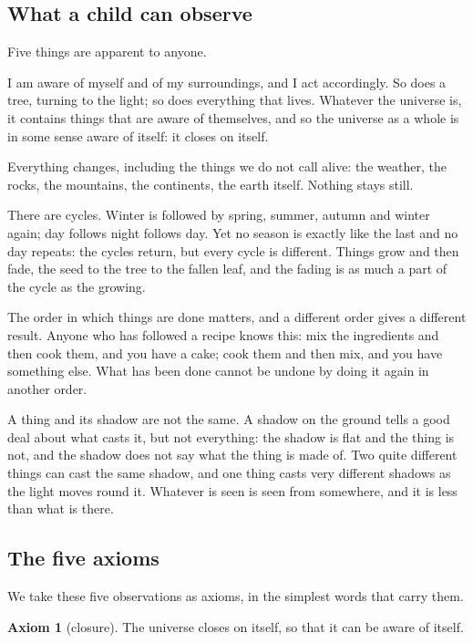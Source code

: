 \documentclass[11pt,a4paper]{article}
\theoremstyle{plain}
\theoremstyle{definition}
\newtheorem{axiom}{Axiom}
\theoremstyle{remark}
\begin{document}
\subsection{What a child can observe}\label{sec:observe}

Five things are apparent to anyone.

I am aware of myself and of my surroundings, and I act accordingly. So does a tree, turning to the light; so does everything that lives. Whatever the universe is, it contains things that are aware of themselves, and so the universe as a whole is in some sense aware of itself: it closes on itself.

Everything changes, including the things we do not call alive: the weather, the rocks, the mountains, the continents, the earth itself. Nothing stays still.

There are cycles. Winter is followed by spring, summer, autumn and winter again; day follows night follows day. Yet no season is exactly like the last and no day repeats: the cycles return, but every cycle is different. Things grow and then fade, the seed to the tree to the fallen leaf, and the fading is as much a part of the cycle as the growing.

The order in which things are done matters, and a different order gives a different result. Anyone who has followed a recipe knows this: mix the ingredients and then cook them, and you have a cake; cook them and then mix, and you have something else. What has been done cannot be undone by doing it again in another order.

A thing and its shadow are not the same. A shadow on the ground tells a good deal about what casts it, but not everything: the shadow is flat and the thing is not, and the shadow does not say what the thing is made of. Two quite different things can cast the same shadow, and one thing casts very different shadows as the light moves round it. Whatever is seen is seen from somewhere, and it is less than what is there.

\subsection{The five axioms}\label{sec:fouraxioms}

We take these five observations as axioms, in the simplest words that carry them.

\begin{axiom}[closure]\label{ax:A1}
The universe closes on itself, so that it can be aware of itself.
\end{axiom}
\end{document}
